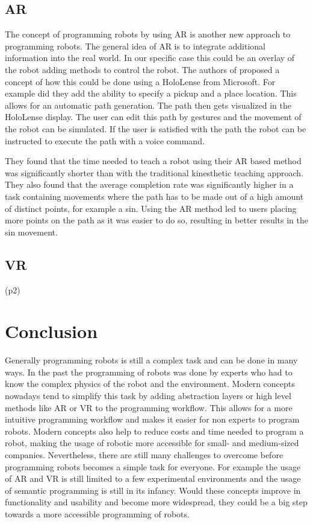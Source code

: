 \documentclass[conference]{IEEEtran}
\begin{document}
    \subsection{AR}
    
        The concept of programming robots by using AR is another new approach to programming robots.
        The general idea of AR is to integrate additional information into the real world. In our specific case this could be an overlay of the robot adding methods to control the robot.
        The authors of \cite{p3} proposed a concept of how this could be done using a HoloLense from Microsoft.
        For example did they add the ability to specify a pickup and a place location. This allows for an automatic path generation. The path then gets visualized in the HoloLense display. The user can edit this path by gestures and the movement of the robot can be simulated.
        If the user is satisfied with the path the robot can be instructed to execute the path with a voice command. %
        \cite[p. 2]{p3}

        They found that the time needed to teach a robot using their AR based method was significantly shorter than with the traditional kinesthetic teaching approach. 
        They also found that the average completion rate was significantly higher in a task containing movements where the path has to be made out of a high amount of distinct points, for example a sin. Using the AR method led to users placing more points on the path as it was easier to do so, resulting in better results in the sin movement.
        \cite[pp. 4-5]{p3}

    \subsection{VR}

        (p2)


\section{Conclusion}

    Generally programming robots is still a complex task and can be done in many ways. 
    In the past the programming of robots was done by experts who had to know the complex physics of the robot and the environment. Modern concepts nowadays tend to simplify this task by adding abstraction layers or high level methods like AR or VR to the programming workflow. This allows for a more intuitive programming workflow and makes it easier for non experts to program robots. Modern concepts also help to reduce costs and time needed to program a robot, making the usage of robotic more accessible for small- and medium-sized companies.
    Nevertheless, there are still many challenges to overcome before programming robots becomes a simple task for everyone. For example the usage of AR and VR is still limited to a few experimental environments and the usage of semantic programming is still in its infancy. Would these concepts improve in functionality and usability and become more widespread, they could be a big step towards a more accessible programming of robots.
\end{document}
